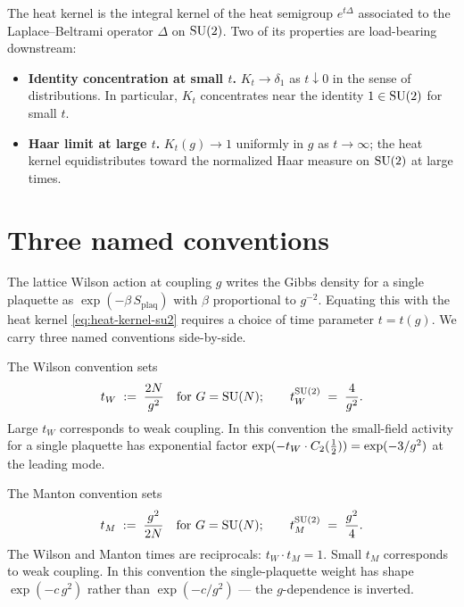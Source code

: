 The heat kernel is the integral kernel of the heat semigroup
$e^{t\Delta}$ associated to the Laplace--Beltrami operator
$\Delta$ on $\mathrm{SU}(2)$.  Two of its properties are load-bearing
downstream:

\begin{itemize}
  \item \textbf{Identity concentration at small $t$.}
    $K_t \to \delta_1$ as $t \downarrow 0$ in the sense of
    distributions.  In particular, $K_t$ concentrates near the
    identity $1 \in \mathrm{SU}(2)$ for small $t$.
  \item \textbf{Haar limit at large $t$.}  $K_t(g) \to 1$
    uniformly in $g$ as $t \to \infty$; the heat kernel
    equidistributes toward the normalized Haar measure on
    $\mathrm{SU}(2)$ at large times.
\end{itemize}

\section{Three named conventions}
\label{sec:heat-kernel-conventions}

The lattice Wilson action at coupling $g$ writes the Gibbs density
for a single plaquette as $\exp(-\beta\, S_{\mathrm{plaq}})$ with
$\beta$ proportional to $g^{-2}$.  Equating this with the heat
kernel \eqref{eq:heat-kernel-su2} requires a choice of time
parameter $t = t(g)$.  We carry three named conventions
side-by-side.

\begin{convention}[Wilson]
\label{conv:wilson}
The Wilson convention sets
\begin{equation}
  \label{eq:wilson-time}
  t_W \;:=\; \frac{2N}{g^2} \quad\text{for $G = \mathrm{SU}(N)$};
  \qquad
  t_W^{\mathrm{SU}(2)} \;=\; \frac{4}{g^2}.
\end{equation}
Large $t_W$ corresponds to weak coupling.  In this convention the
small-field activity for a single plaquette has exponential factor
$\exp(-t_W \cdot C_2(\tfrac12)) = \exp(-3/g^2)$ at the leading
mode.
\end{convention}

\begin{convention}
\label{conv:manton}
The Manton convention sets
\begin{equation}
  \label{eq:manton-time}
  t_M \;:=\; \frac{g^2}{2N} \quad\text{for $G = \mathrm{SU}(N)$};
  \qquad
  t_M^{\mathrm{SU}(2)} \;=\; \frac{g^2}{4}.
\end{equation}
The Wilson and Manton times are reciprocals: $t_W \cdot t_M = 1$.
Small $t_M$ corresponds to weak coupling.  In this convention the
single-plaquette weight has shape $\exp(-c\, g^2)$ rather than
$\exp(-c / g^2)$ — the $g$-dependence is inverted.
\end{convention}

